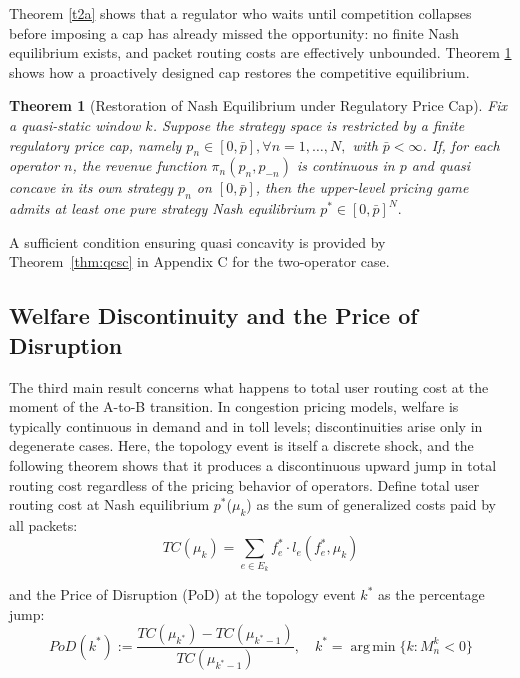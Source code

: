 \documentclass[review,3p,authoryear]{elsarticle}
\newtheorem{theorem}{Theorem}[section]
\begin{document}
Theorem \ref{t2a} shows that a regulator who waits until competition collapses before imposing a cap has already missed the opportunity: no finite Nash equilibrium exists, and packet routing costs are effectively unbounded. Theorem \ref{t2b} shows how a proactively designed cap restores the competitive equilibrium.

\begin{theorem}[Restoration of Nash Equilibrium under Regulatory Price Cap]\label{t2b}
Fix a quasi-static window $k$. Suppose the strategy space is restricted by a finite regulatory price cap, namely $p_{n}{\in}[0,\bar{p}],{\forall}n=1,{\dots},N,$ with $\bar{p}<{\infty}$. If, for each operator $n$, the revenue function ${\pi}_{n}(p_{n},p_{-n})$ is continuous in $p$ and quasi concave in its own strategy $p_{n}$ on $\left[0, \bar{p}\right]$, then the upper-level pricing game admits at least one pure strategy Nash equilibrium $p^{*}{\in}[0,\bar{p}]^{N}.$
\end{theorem}

A sufficient condition ensuring quasi concavity is provided by Theorem~\ref{thm:qcsc} in Appendix C for the two-operator case.

\subsection{Welfare Discontinuity and the Price of Disruption}

The third main result concerns what happens to total user routing cost at the moment of the A-to-B transition. In congestion pricing models, welfare is typically continuous in demand and in toll levels; discontinuities arise only in degenerate cases. Here, the topology event is itself a discrete shock, and the following theorem shows that it produces a discontinuous upward jump in total routing cost regardless of the pricing behavior of operators. Define total user routing cost at Nash equilibrium $p^{*}$(${\mu}_{k}$) as the sum of generalized costs paid by all packets:
\begin{equation}
TC({\mu}_{k}) = \sum_{e \in E_k} f_e^* \cdot l_e (f_e^*, \mu_k)
\end{equation}

and the Price of Disruption (PoD) at the topology event $k^*$ as the percentage jump:
\begin{equation}
    PoD(k^*) := \frac{TC({\mu}_{k^*}) - TC({\mu}_{k^*-1})}{TC({\mu}_{k^*-1})}, \quad k^* = \operatorname*{arg\,min}\{k : M_{n}^{k} < 0\}
    \label{eq6}
\end{equation}
\end{document}
